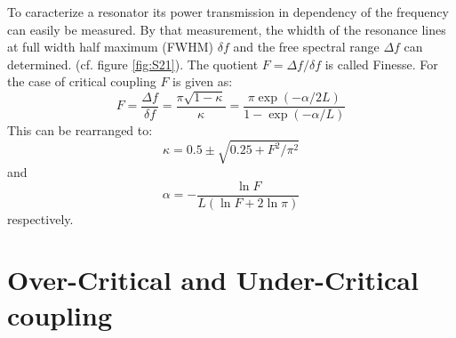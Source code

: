 To caracterize a resonator its power transmission in dependency of the frequency can easily be measured. By that measurement, the whidth of the resonance lines at full width half maximum (FWHM) $\delta f$ and the free spectral range $\Delta f$ can determined. (cf. figure \ref{fig:S21}). The quotient $F= \Delta f/\delta f$ is called Finesse. For the case of critical coupling $F$ is given as:
\begin{equation}
 F = \frac{\Delta f}{\delta f} = \frac{\pi\sqrt{1-\kappa}}{\kappa}=\frac{\pi\exp\left(-\alpha/2L\right)}{1-\exp\left(-\alpha/L\right)}
\end{equation}
This can be rearranged to:
\begin{equation}
 \kappa = 0.5 \pm \sqrt{0.25+F^2/\pi^2}
\end{equation}
and
\begin{equation}
\alpha = -\frac{\ln F}{L(\ln F+2\ln\pi)} 
\end{equation}
respectively.

\section{Over-Critical and Under-Critical coupling}
